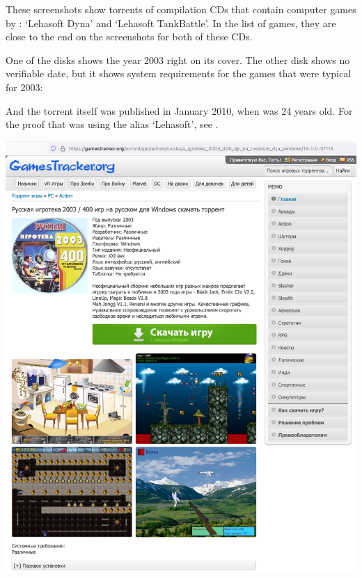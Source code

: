 
These screenshots show torrents of compilation CDs
that contain computer games by \mrl: `Lehasoft Dyna' and `Lehasoft TankBattle'.
In the list of games, they are close to the end on the screenshots
for both of these CDs.

One of the disks shows the year 2003 right on its cover.
The other disk shows no verifiable date, but it shows system requirements for the games
that were typical for 2003:


And the torrent itself was published in January 2010, when \mrl was 24 years old.
For the proof that \mrl was using the alias `Lehasoft', see .



\begin{center}
    \includegraphics[width=\textwidth]{igroteka-p1}
\end{center}
\WillContinue
\pagebreak

